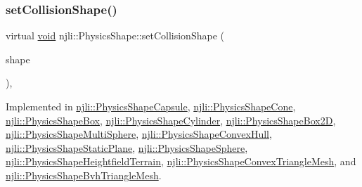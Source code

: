 \subsubsection{\texorpdfstring{set\+Collision\+Shape()}{setCollisionShape()}}
{\footnotesize\ttfamily virtual \mbox{\hyperlink{_thread_8h_af1e856da2e658414cb2456cb6f7ebc66}{void}} njli\+::\+Physics\+Shape\+::set\+Collision\+Shape (\begin{DoxyParamCaption}\item[{const bt\+Collision\+Shape \&}]{shape }\end{DoxyParamCaption})\hspace{0.3cm}{\ttfamily [protected]}, {}}



Implemented in \mbox{\hyperlink{classnjli_1_1_physics_shape_capsule_a8f520536b574f254ba6635ab2fe644cc}{njli\+::\+Physics\+Shape\+Capsule}}, \mbox{\hyperlink{classnjli_1_1_physics_shape_cone_a9d1a22e39d9a3b70646df7ff58bd46c0}{njli\+::\+Physics\+Shape\+Cone}}, \mbox{\hyperlink{classnjli_1_1_physics_shape_box_afef84525d2cb60ad5f2386a4faf4db9a}{njli\+::\+Physics\+Shape\+Box}}, \mbox{\hyperlink{classnjli_1_1_physics_shape_cylinder_aca6f41dfec9b3287717357cbfa57935a}{njli\+::\+Physics\+Shape\+Cylinder}}, \mbox{\hyperlink{classnjli_1_1_physics_shape_box2_d_a5948eb2b64291b9ad1e1ce711326b5c6}{njli\+::\+Physics\+Shape\+Box2D}}, \mbox{\hyperlink{classnjli_1_1_physics_shape_multi_sphere_ae54e42a11d5b7737dad326aa1c11b2ad}{njli\+::\+Physics\+Shape\+Multi\+Sphere}}, \mbox{\hyperlink{classnjli_1_1_physics_shape_convex_hull_a0fbc71273b102cffdb224798d5cf0d49}{njli\+::\+Physics\+Shape\+Convex\+Hull}}, \mbox{\hyperlink{classnjli_1_1_physics_shape_static_plane_a5ebd80dd3f719bc9f172f29e3bdf290d}{njli\+::\+Physics\+Shape\+Static\+Plane}}, \mbox{\hyperlink{classnjli_1_1_physics_shape_sphere_a6c4f6e4cd8f796892bce7c3c09f0d14b}{njli\+::\+Physics\+Shape\+Sphere}}, \mbox{\hyperlink{classnjli_1_1_physics_shape_heightfield_terrain_aba0df18d6c428c60f6efe61bb0fe1699}{njli\+::\+Physics\+Shape\+Heightfield\+Terrain}}, \mbox{\hyperlink{classnjli_1_1_physics_shape_convex_triangle_mesh_a5fb1e1a0a980e346a919d155ac5c2c82}{njli\+::\+Physics\+Shape\+Convex\+Triangle\+Mesh}}, and \mbox{\hyperlink{classnjli_1_1_physics_shape_bvh_triangle_mesh_a5aaf42224afb0773a280daddfa3c93d1}{njli\+::\+Physics\+Shape\+Bvh\+Triangle\+Mesh}}.

\mbox{\label{classnjli_1_1_physics_shape_afd2f02f3fd7ab5c1b48f445f2831f18f}} 
